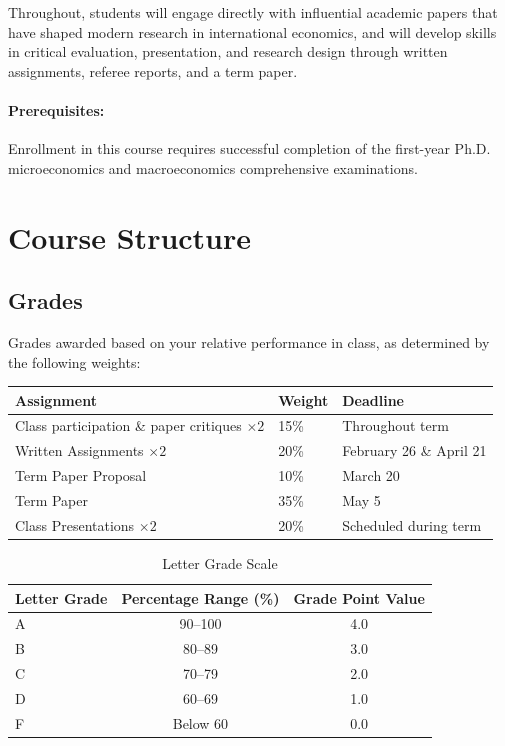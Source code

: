 \documentclass[10pt]{article}
\newcommand{\ra}[1]{\renewcommand{\arraystretch}{#1}}
\begin{document}
Throughout, students will engage directly with influential academic papers that have shaped modern research in international economics, and will develop skills in critical evaluation, presentation, and research design through written assignments, referee reports, and a term paper.

\paragraph{Prerequisites:} Enrollment in this course requires successful completion of the first-year Ph.D. microeconomics and macroeconomics comprehensive examinations.


\section*{Course Structure}

\subsection*{Grades}

Grades awarded based on your relative performance in class, as determined by the following weights:
\begin{table}[!h]
    \ra{1.2}
    \centering
    \begin{tabular}{@{\extracolsep{1cm}}lll@{}}
        \textbf{Assignment} & \textbf{Weight} & \textbf{Deadline} \\
        \midrule
        Class participation \& paper critiques $\times 2$ & 15\% &  Throughout term \\
        Written Assignments $\times 2$ & 20\% &  February 26 \& April 21 \\
        Term Paper Proposal & 10\% & March 20 \\
        Term Paper & 35\% & May 5 \\
        Class Presentations $\times 2$ & 20\% &  Scheduled during term \\
    \end{tabular}
\end{table}

  
  \begin{table}[h!]
\centering
\caption{Letter Grade Scale}
\begin{tabular}{lcc}
\toprule
\textbf{Letter Grade} & \textbf{Percentage Range (\%)} & \textbf{Grade Point Value} \\
\midrule
A  & 90--100  & 4.0 \\
B  & 80--89   & 3.0 \\
C  & 70--79   & 2.0 \\
D  & 60--69   & 1.0 \\
F  & Below 60 & 0.0 \\
\bottomrule
\end{tabular}
\end{table}
  
\end{document}
